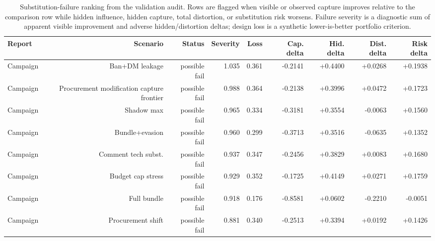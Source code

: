 \begin{table}[tbp]
\centering
\scriptsize
\setlength{\tabcolsep}{1.5pt}
\begin{tabular*}{\textwidth}{@{\extracolsep{\fill}}lrrrrrrrr@{}}
\toprule
Report & Scenario & Status & Severity & Loss & Cap. delta & Hid. delta & Dist. delta & Risk delta \\
\midrule
Campaign & Ban+DM leakage & possible fail & 1.035 & 0.361 & -0.2141 & +0.4400 & +0.0268 & +0.1938 \\
Campaign & Procurement modification capture frontier & possible fail & 0.988 & 0.364 & -0.2138 & +0.3996 & +0.0472 & +0.1723 \\
Campaign & Shadow max & possible fail & 0.965 & 0.334 & -0.3181 & +0.3554 & -0.0063 & +0.1560 \\
Campaign & Bundle+evasion & possible fail & 0.960 & 0.299 & -0.3713 & +0.3516 & -0.0635 & +0.1352 \\
Campaign & Comment tech subst. & possible fail & 0.937 & 0.347 & -0.2456 & +0.3829 & +0.0083 & +0.1680 \\
Campaign & Budget cap stress & possible fail & 0.929 & 0.352 & -0.1725 & +0.4149 & +0.0271 & +0.1759 \\
Campaign & Full bundle & possible fail & 0.918 & 0.176 & -0.8581 & +0.0602 & -0.2210 & -0.0051 \\
Campaign & Procurement shift & possible fail & 0.881 & 0.340 & -0.2513 & +0.3394 & +0.0192 & +0.1426 \\
\bottomrule
\end{tabular*}
\caption{Substitution-failure ranking from the validation audit. Rows are flagged when visible or observed capture improves relative to the comparison row while hidden influence, hidden capture, total distortion, or substitution risk worsens. Failure severity is a diagnostic sum of apparent visible improvement and adverse hidden/distortion deltas; design loss is a synthetic lower-is-better portfolio criterion.}
\label{tab:substitution-failures}
\end{table}
